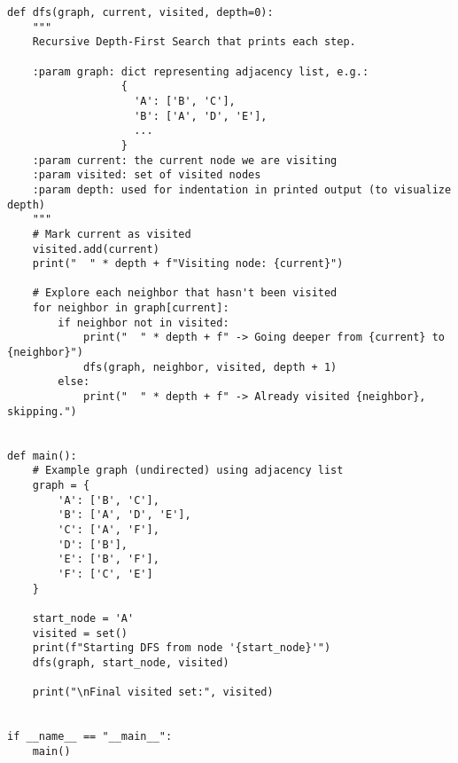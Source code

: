 \documentclass[a4paper,12pt]{article}
\begin{document}
\begin{lstlisting}[style=pythonstyle]
def dfs(graph, current, visited, depth=0):
    """
    Recursive Depth-First Search that prints each step.
    
    :param graph: dict representing adjacency list, e.g.:
                  {
                    'A': ['B', 'C'],
                    'B': ['A', 'D', 'E'],
                    ...
                  }
    :param current: the current node we are visiting
    :param visited: set of visited nodes
    :param depth: used for indentation in printed output (to visualize depth)
    """
    # Mark current as visited
    visited.add(current)
    print("  " * depth + f"Visiting node: {current}")

    # Explore each neighbor that hasn't been visited
    for neighbor in graph[current]:
        if neighbor not in visited:
            print("  " * depth + f" -> Going deeper from {current} to {neighbor}")
            dfs(graph, neighbor, visited, depth + 1)
        else:
            print("  " * depth + f" -> Already visited {neighbor}, skipping.")


def main():
    # Example graph (undirected) using adjacency list
    graph = {
        'A': ['B', 'C'],
        'B': ['A', 'D', 'E'],
        'C': ['A', 'F'],
        'D': ['B'],
        'E': ['B', 'F'],
        'F': ['C', 'E']
    }

    start_node = 'A'
    visited = set()
    print(f"Starting DFS from node '{start_node}'")
    dfs(graph, start_node, visited)

    print("\nFinal visited set:", visited)


if __name__ == "__main__":
    main()

\end{lstlisting}
\end{document}
